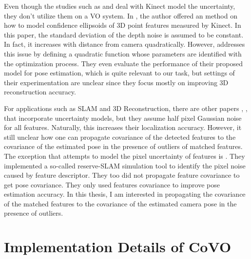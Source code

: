 \documentclass[12pt]{report}
\numberwithin{figure}{section}
\begin{document}
Even though the studies such as \parencite{Park2012a} and 
\parencite{Nguyen2012a} 
deal with Kinect model the uncertainty, they don't utilize them on a VO 
system. In
\parencite{Park2012a}, the author offered an method on how 
to
model confidence ellipsoids of 3D point features measured by Kinect. In this
paper, the standard deviation of the depth noise is assumed to be constant.  In
fact, it increases with distance from camera quadratically. However, 
\parencite{Nguyen2012a} addresses this issue by defining a quadratic function 
whose parameters
are identified with the optimization process.  They even evaluate the
performance of their proposed model for pose estimation, which is quite
relevant to our task, but settings of their experimentation are unclear since
they focus mostly on improving 3D reconstruction accuracy.

For applications such as SLAM and 3D Reconstruction, there are other papers
\parencite{Endres2014}, \parencite{Konolige08}, \parencite{Di2016a} that 
incorporate
uncertainty models, but they assume half pixel Gaussian noise for all features.
Naturally, this increases their localization accuracy. However, it still
unclear how one can propagate covariance of the detected features to the
covariance of the estimated pose in the presence of outliers of matched
features.  The exception that attempts to model the pixel uncertainty of
features is \parencite{Belter2018a}.  They implemented a so-called reserve-SLAM
simulation tool to identify the pixel noise caused by feature descriptor.  They
too did not propagate feature covariance to get pose covariance.  They only
used features covariance to improve pose estimation accuracy.  In this thesis,
I am interested in propagating the covariance of the matched features to the
covariance of the estimated camera pose in the presence of outliers.

\section{Implementation Details of CoVO}
\end{document}
